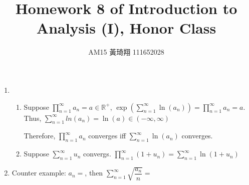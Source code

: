 \documentclass[12pt]{article}
\title{Homework 8 of Introduction to Analysis (I), Honor Class}
\author{AM15 黃琦翔 111652028}
\begin{document}
\maketitle
\begin{enumerate}
    \item\begin{enumerate}
        \item Suppose $\displaystyle\prod_{n=1}^{\infty} a_n = a \in \mathbb{R}^+$, 
        $\exp(\displaystyle\sum_{n=1}^{\infty} \ln(a_n)) = \displaystyle\prod_{n=1}^{\infty} a_n = a$.
        Thus, $\displaystyle\sum_{n=1}^{\infty} ln(a_n) = \ln(a)\in (-\infty, \infty)$

        Therefore, $\displaystyle\prod_{n=1}^{\infty} a_n$ converges iff $\displaystyle\sum_{n=1}^{\infty} \ln(a_n)$ converges.

        \item Suppose $\displaystyle\sum_{n=1}^{\infty} u_n$ convergs.
        $\displaystyle\prod_{n=1}^{\infty} (1 + u_n) = \displaystyle\sum_{n=1}^{\infty} \ln(1 + u_n)$
    \end{enumerate}

    \item

    Counter example: $a_n = $, then $\displaystyle\sum_{n=1}^{\infty}\sqrt{\dfrac{a_n}{n}} = $
\end{enumerate}
\end{document}

